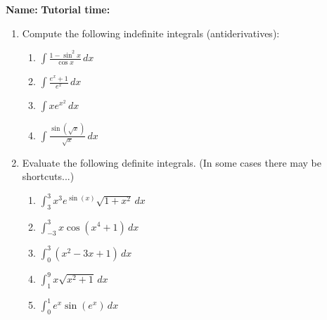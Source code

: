 \documentclass[12pt]{article}
\newcommand{\di}{\displaystyle}
\begin{document}
{\bf \large Name:} \hspace{2.5in} {\bf Tutorial time:}

\bigskip

\bigskip

\thispagestyle{fancy}

\begin{enumerate}
 \item Compute the following indefinite integrals (antiderivatives):

\begin{enumerate}
 \item $\di \int \frac{1-\sin^2x}{\cos x}\,dx$

\vspace{1.75in}

 \item $\di \int \frac{e^x+1}{e^x}\, dx$

\vspace{1.75in}

 \item $\di \int xe^{x^2}\,dx$

\vspace{1.75in}

 \item $\di \int \frac{\sin(\sqrt{x})}{\sqrt{x}}\,dx$
\end{enumerate}
\newpage

 \item Evaluate the following definite integrals. (In some cases there may be shortcuts...)
\begin{enumerate}
 \item $\di \int_3^3 x^3e^{\sin(x)}\sqrt{1+x^2}\,dx$

\vspace{0.5in}

 \item $\di \int_{-3}^3 x\cos(x^4+1)\,dx$

\vspace{0.75in}

 \item $\di \int_0^3 (x^2-3x+1)\,dx$

\vspace{2in}

 \item $\di \int_1^9 x\sqrt{x^2+1}\,dx$

\vspace{2in}

 \item $\di \int_0^1 e^x\sin(e^x)\,dx$
\end{enumerate}


\end{enumerate}
 
\end{document}
